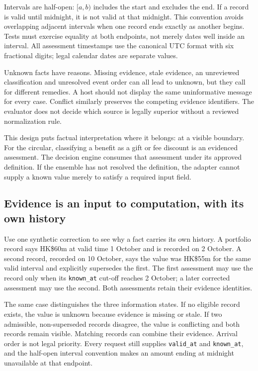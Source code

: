 \documentclass[12pt,a4paper,oneside,openany]{book}
\begin{document}
Intervals are half-open: $[a,b)$ includes the start and excludes the end. If a
record is valid until midnight, it is not valid at that midnight. This convention
avoids overlapping adjacent intervals when one record ends exactly as another
begins. Tests must exercise equality at both endpoints, not merely dates well
inside an interval. All assessment timestamps use the canonical UTC format with
six fractional digits; legal calendar dates are separate values.

Unknown facts have reasons. Missing evidence, stale evidence, an unreviewed
classification and unresolved event order can all lead to unknown, but they call
for different remedies. A host should not display the same uninformative message
for every case. Conflict similarly preserves the competing evidence identifiers.
The evaluator does not decide which source is legally superior without a
reviewed normalization rule.

This design puts factual interpretation where it belongs: at a visible boundary.
For the circular, classifying a benefit as a gift or fee discount is an evidenced
assessment. The decision engine consumes that assessment under its approved
definition. If the ensemble has not resolved the definition, the adapter cannot
supply a known value merely to satisfy a required input field.

\subsection{Evidence is an input to computation, with its own history}
\label{merge:P-03a-rule-contract:01}


Use one synthetic correction to see why a fact carries its own history. A portfolio
record says HK\$60m at valid time 1 October and is recorded on 2 October. A second
record, recorded on 10 October, says the value was HK\$55m for the same valid
interval and explicitly supersedes the first. The first assessment may use the
record only when its \texttt{known\_at} cut-off reaches 2 October; a later corrected
assessment may use the second. Both assessments retain their evidence identities.

The same case distinguishes the three information states. If no eligible record exists,
the value is unknown because evidence is missing or stale. If two admissible,
non-superseded records disagree, the value is conflicting and both records remain
visible. Matching records can combine their evidence. Arrival order is not legal
priority. Every request still supplies \texttt{valid\_at} and \texttt{known\_at},
and the half-open interval convention makes an amount ending at midnight unavailable at that endpoint.
\end{document}
